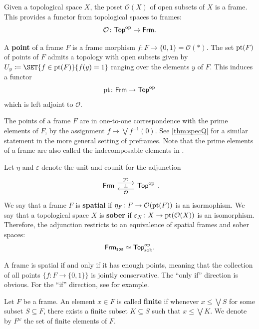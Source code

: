 \documentclass[10pt,a4paper,oneside]{article}
\begin{document}
\begin{rem}
Given a topological space $X$, the poset $\mathcal{O}(X)$ of open subsets of $X$ is a frame. This provides a functor from topological spaces to frames:
\[
\mathcal{O}\colon \mathsf{Top}^{\operatorname{op}} \to \mathsf{Frm}.
\]
\end{rem}

\begin{de}\label{de:pt}
A \textbf{point} of a frame $F$ is a frame morphism $f\colon F \to \{0,1\} = \mathcal{O}(\ast)$. The set $\operatorname{pt}(F)$ of points of $F$ admits a topology with open subsets given by $U_y \coloneqq \SET{f\in \op{pt}(F)}{f(y)=1}$ ranging over the elements $y$ of $F$. This induces a functor
\[
\operatorname{pt}\colon \mathsf{Frm} \to \mathsf{Top}^{\operatorname{op}}
\]
which is left adjoint to $\mathcal{O}$.
\end{de}

\begin{rem}
The points of a frame $F$ are in one-to-one correspondence with the prime elements of $F$, 
by the assignment $f\mapsto \bigvee f^{-1}(0) $. See \cref{thm:specQ} for a similar statement in the more general setting of preframes. Note that the prime elements of a frame are also called the indecomposable elements in \cite{sag}.
\end{rem}

\begin{de}
Let $\eta$ and $\varepsilon$ denote the unit and counit for the adjunction
\[
\begin{tikzcd}
\frm  \arrow[r, "\op{pt}", shift right=-1ex]  & \arrow[l,"\perp"', "\mathcal{O}", shift right=-1ex] \Top \end{tikzcd}.
\]
We say that a frame $F$ is \textbf{spatial} if $\eta_F\colon F\to\mathcal{O}(\operatorname{pt}(F))$ is an isormophism. We say that a topological space $X$ is \textbf{sober} if $\varepsilon_X\colon X\to\operatorname{pt}(\mathcal{O}(X))$ is an isomorphism. Therefore, the adjunction restricts to an equivalence of spatial frames and sober spaces:
\[
\mathsf{Frm}_{\mathsf{spa}} \simeq \mathsf{Top}^{\operatorname{op}}_{\operatorname{sob}}.
\]
\end{de}

\begin{rem}
A frame is spatial if and only if it has enough points, meaning that the collection of all points $\{f:F\to\{0,1\}\}$ is jointly conservative. The ``only if'' direction is obvious. For the ``if'' direction, see \cite[Example 1.5.4.5]{sag} for example. 
\end{rem}


\begin{de}\label{def:frame-finite-elt}
Let $F$ be a frame. An element $x \in F$ is called \textbf{finite} if whenever $x \le \bigvee S$ for some subset $S \subseteq F$, there exists a finite subset $K\subseteq S$ such that $x \le \bigvee K$. We denote by $F^{\omega}$ the set of finite elements of $F$.
\end{de}
\end{document}
